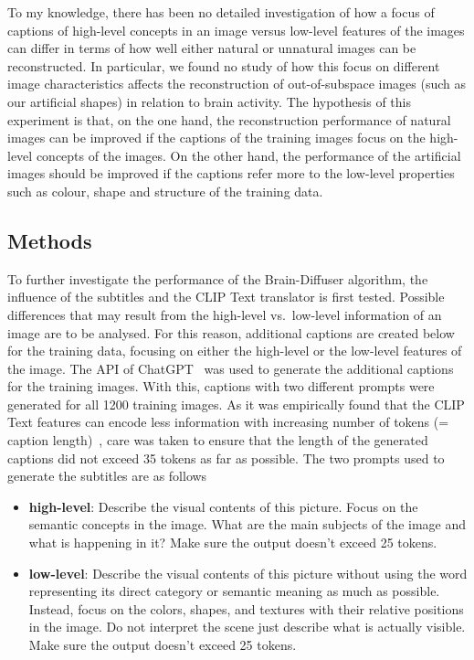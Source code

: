 To my knowledge, there has been no detailed investigation of how a focus of captions of high-level concepts in an image versus low-level features of the images can differ in terms of how well either natural or unnatural images can be reconstructed. In particular, we found no study of how this focus on different image characteristics affects the reconstruction of out-of-subspace images (such as our artificial shapes) in relation to brain activity. The hypothesis of this experiment is that, on the one hand, the reconstruction performance of natural images can be improved if the captions of the training images focus on the high-level concepts of the images. On the other hand, the performance of the artificial images should be improved if the captions refer more to the low-level properties such as colour, shape and structure of the training data.


\subsection{Methods}
To further investigate the performance of the Brain-Diffuser algorithm, the influence of the subtitles and the CLIP Text translator is first tested. Possible differences that may result from the high-level vs.\ low-level information of an image are to be analysed. For this reason, additional captions are created below for the training data, focusing on either the high-level or the low-level features of the image. The API of ChatGPT~\cite{OpenAI_ChatGPT_2024} was used to generate the additional captions for the training images. With this, captions with two different prompts were generated for all 1200 training images. As it was empirically found that the CLIP Text features can encode less information with increasing number of tokens (= caption length)~\cite{zhangLongCLIPUnlockingLongText2024}, care was taken to ensure that the length of the generated captions did not exceed 35 tokens as far as possible. The two prompts used to generate the subtitles are as follows
\begin{itemize}
    \item \textbf{high-level}: Describe the visual contents of this picture. Focus on the semantic concepts in the image. What are the main subjects of the image and what is happening in it? Make sure the output doesn't exceed 25 tokens.
    \item \textbf{low-level}: Describe the visual contents of this picture without using the word representing its direct category or semantic meaning as much as possible. Instead, focus on the colors, shapes, and textures with their relative positions in the image. Do not interpret the scene just describe what is actually visible. Make sure the output doesn't exceed 25 tokens.
\end{itemize}

